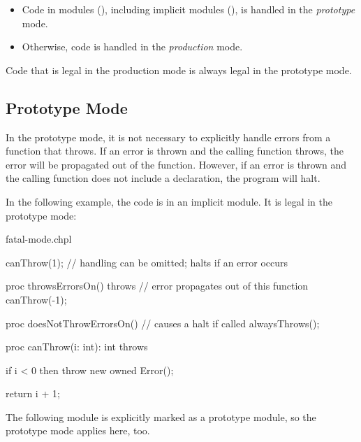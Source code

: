 \begin{itemize}

\item Code in  modules (),
      including implicit modules (),
      is handled in the \emph{prototype} mode.

\item Otherwise, code is handled in the \emph{production} mode.

\end{itemize}

Code that is legal in the production mode is always legal
in the prototype mode.

\subsection{Prototype Mode}
\label{Errors_Prototype_Mode}

In the prototype mode, it is not necessary to explicitly handle
errors from a function that throws. If an error is thrown and the calling
function throws, the error will be propagated out of the function.  However,
if an error is thrown and the calling function does not include
a  declaration, the program will halt.

In the following example, the code is in an implicit module.
It is legal in the prototype mode:

\begin{chapelexample}{fatal-mode.chpl}
\begin{chapel}
canThrow(1); // handling can be omitted; halts if an error occurs

proc throwsErrorsOn() throws {
  // error propagates out of this function
  canThrow(-1);
}

proc doesNotThrowErrorsOn() {
  // causes a halt if called
  alwaysThrows();
}
\end{chapel}
\begin{chapelpost}
proc canThrow(i: int): int throws {
  if i < 0 then
    throw new owned Error();

  return i + 1;
}
\end{chapelpost}
\begin{chapeloutput}
\end{chapeloutput}
\end{chapelexample}

The following module is explicitly marked as a prototype module,
so the prototype mode applies here, too.

